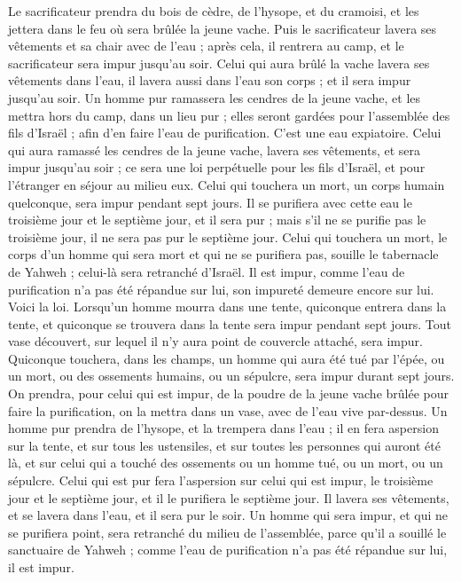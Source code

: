 \begin{multicols}{2}
Le sacrificateur prendra du bois de cèdre, de l'hysope, et du cramoisi, et les jettera dans le feu où sera brûlée la jeune vache.
Puis le sacrificateur lavera ses vêtements et sa chair avec de l'eau ; après cela, il rentrera au camp, et le sacrificateur sera impur jusqu'au soir.
Celui qui aura brûlé la vache lavera ses vêtements dans l'eau, il lavera aussi dans l'eau son corps ; et il sera impur jusqu'au soir.
Un homme pur ramassera les cendres de la jeune vache, et les mettra hors du camp, dans un lieu pur ; elles seront gardées pour l'assemblée des fils d'Israël ; afin d'en faire l'eau de purification. C’est une eau expiatoire.
Celui qui aura ramassé les cendres de la jeune vache, lavera ses vêtements, et sera impur jusqu'au soir ; ce sera une loi perpétuelle pour les fils d'Israël, et pour l'étranger en séjour au milieu eux.
Celui qui touchera un mort, un corps humain quelconque, sera impur pendant sept jours.
Il se purifiera avec cette eau le troisième jour et le septième jour, et il sera pur ; mais s'il ne se purifie pas le troisième jour, il ne sera pas pur le septième jour.
Celui qui touchera un mort, le corps d’un homme qui sera mort et qui ne se purifiera pas, souille le tabernacle de Yahweh ; celui-là sera retranché d'Israël. Il est impur, comme l'eau de purification n'a pas été répandue sur lui, son impureté demeure encore sur lui.
Voici la loi. Lorsqu’un homme mourra dans une tente, quiconque entrera dans la tente, et quiconque se trouvera dans la tente sera impur pendant sept jours.
Tout vase découvert, sur lequel il n'y aura point de couvercle attaché, sera impur.
Quiconque touchera, dans les champs, un homme qui aura été tué par l'épée, ou un mort, ou des ossements humains, ou un sépulcre, sera impur durant sept jours.
On prendra, pour celui qui est impur, de la poudre de la jeune vache brûlée pour faire la purification, on la mettra dans un vase, avec de l'eau vive par-dessus.
Un homme pur prendra de l'hysope, et la trempera dans l'eau ; il en fera aspersion sur la tente, et sur tous les ustensiles, et sur toutes les personnes qui auront été là, et sur celui qui a touché des ossements ou un homme tué, ou un mort, ou un sépulcre.
Celui qui est pur fera l’aspersion sur celui qui est impur, le troisième jour et le septième jour, et il le purifiera le septième jour. Il lavera ses vêtements, et se lavera dans l'eau, et il sera pur le soir.
Un homme qui sera impur, et qui ne se purifiera point, sera retranché du milieu de l'assemblée, parce qu'il a souillé le sanctuaire de Yahweh ; comme l'eau de purification n'a pas été répandue sur lui, il est impur.

\end{multicols}
